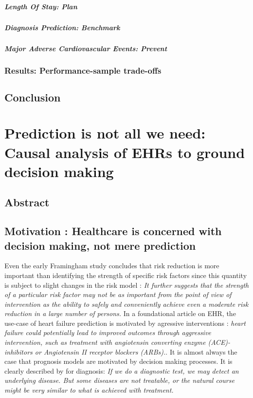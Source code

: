 \documentclass{report}
\begin{document}
\paragraph{Length Of Stay: Plan}

\paragraph{Diagnosis Prediction: Benchmark}

\paragraph{Major Adverse Cardiovascular Events: Prevent}

\subsection{Results: Performance-sample trade-offs}

\section{Conclusion}\label{sec:predictive_models:conclusion}

\chapter{Prediction is not all we need: Causal analysis of EHRs to ground decision making}\label{chapter:causal_tuto}
\section{Abstract}\label{sec:causal_tuto:abstract}

\section{Motivation : Healthcare is concerned with decision making, not mere
  prediction}\label{sec:causal_tuto:motivation}


Even the early Framingham study concludes that risk reduction is more important
than identifying the strength of specific risk factors since this quantity is
subject to slight changes in the risk model \citep{brand1976multivariate}:
\textit{It further suggests that the strength of a particular risk factor may
  not be as important from the point of view of intervention as the ability to
  safely and conveniently achieve even a moderate risk reduction in a large number
  of persons.}
In a foundational article on EHR, the use-case of heart failure prediction is
motivated by agressive interventions \citep{wu2010prediction}: \textit{heart
  failure could potentially lead to improved outcomes through aggressive
  intervention, such as treatment with angiotensin converting enzyme
  (ACE)-inhibitors or Angiotensin II receptor blockers (ARBs).}. It is almost
always the case that prognosis models are motivated by decision making
processes. It is clearly described by \cite{steyerberg2009applications} for
diagnosis: \textit{If we do a diagnostic test, we may detect an underlying
  disease. But some diseases are not treatable, or the natural course might be
  very similar to what is achieved with treatment.}
\end{document}
